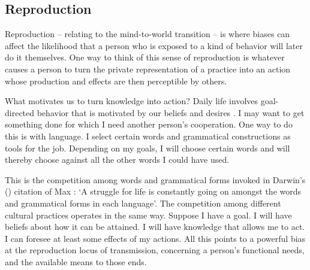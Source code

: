 \subsection{Reproduction}
Reproduction -- relating to the mind-to-world transition -- is where biases can affect the likelihood that a person who is exposed to a kind of behavior will later do it themselves. One way to think of this sense of reproduction is whatever causes a 
person to turn the private representation of a practice into an action 
whose production and effects are then perceptible by others.



What motivates us to turn knowledge into action? Daily life involves 
goal-directed behavior that is motivated by our beliefs and desires  
\citep{davidson_essential_2006,searle_intentionality:_1983,fodor_psychosemantics_1987}. I may want to get 
something done for which I need another person's cooperation. One way to do this is with language. I select certain words and 
grammatical constructions as tools for the job. Depending on my goals, I will choose
certain words and will thereby choose against all the other words I 
could have used. 



This is the competition among words and grammatical forms invoked in 
Darwin's (\citeyear[60]{darwin_descent_1871}) citation of Max \citet{muller_darwinism_1870}: \textquoteleft A struggle for 
life is constantly going on amongst the words and grammatical forms in 
each language'. The competition among different cultural practices 
operates in the same way. Suppose I have a goal. I will have beliefs about 
how it can be attained. I will have knowledge that allows me to act. I can foresee at least some effects of my actions. All this 
points to a powerful bias at the reproduction locus of transmission, concerning a person's functional needs, and the available means to those ends. 



